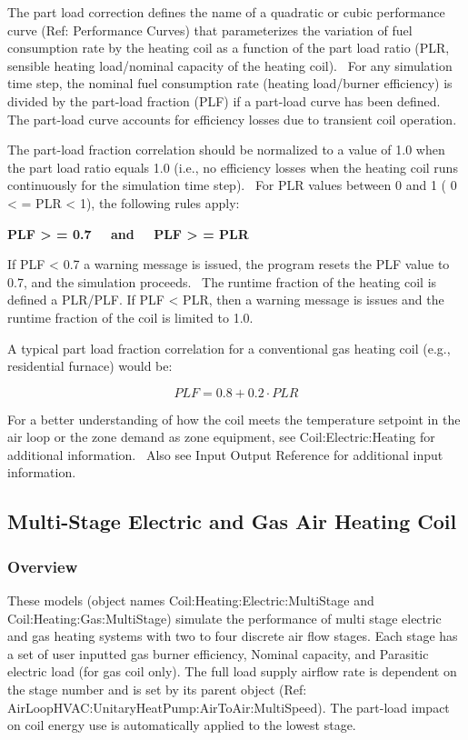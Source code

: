 The part load correction defines the name of a quadratic or cubic performance curve (Ref: Performance Curves) that parameterizes the variation of fuel consumption rate by the heating coil as a function of the part load ratio (PLR, sensible heating load/nominal capacity of the heating coil).~ For any simulation time step, the nominal fuel consumption rate (heating load/burner efficiency) is divided by the part-load fraction (PLF) if a part-load curve has been defined.~ The part-load curve accounts for efficiency losses due to transient coil operation.

The part-load fraction correlation should be normalized to a value of 1.0 when the part load ratio equals 1.0 (i.e., no efficiency losses when the heating coil runs continuously for the simulation time step).~ For PLR values between 0 and 1 ( 0 \textless{} = PLR \textless{} 1), the following rules apply:

\textbf{PLF \textgreater{} = 0.7~~ and~~ PLF \textgreater{} = PLR}

If PLF \textless{} 0.7 a warning message is issued, the program resets the PLF value to 0.7, and the simulation proceeds.~ The runtime fraction of the heating coil is defined a PLR/PLF. If PLF \textless{} PLR, then a warning message is issues and the runtime fraction of the coil is limited to 1.0.

A typical part load fraction correlation for a conventional gas heating coil (e.g., residential furnace) would be:

\begin{equation}
PLF = 0.8 + 0.2\cdot PLR
\end{equation}

For a better understanding of how the coil meets the temperature setpoint in the air loop or the zone demand as zone equipment, see Coil:Electric:Heating for additional information.~ Also see Input Output Reference for additional input information.

\subsection{Multi-Stage Electric and Gas Air Heating Coil}\label{multi-stage-electric-and-gas-air-heating-coil}

\subsubsection{Overview}\label{overview-5-001}

These models (object names Coil:Heating:Electric:MultiStage and Coil:Heating:Gas:MultiStage) simulate the performance of multi stage electric and gas heating systems with two to four discrete air flow stages. Each stage has a set of user inputted gas burner efficiency, Nominal capacity, and Parasitic electric load (for gas coil only). The full load supply airflow rate is dependent on the stage number and is set by its parent object (Ref: AirLoopHVAC:UnitaryHeatPump:AirToAir:MultiSpeed). The part-load impact on coil energy use is automatically applied to the lowest stage.

